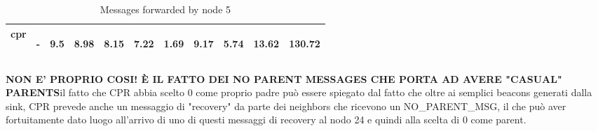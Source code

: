 \documentclass{article}
\begin{document}
\begin{table}[H]
\begin{center}
\begin{tabular}{|c|c|c|c|c|c|c|c|c|c|c|}
				    cpr & \begin{footnotesize}-\end{footnotesize} & \begin{footnotesize}9.5\end{footnotesize} & \begin{footnotesize}8.98\end{footnotesize} & \begin{footnotesize}8.15\end{footnotesize} & \begin{footnotesize}7.22\end{footnotesize} & \begin{footnotesize}1.69\end{footnotesize} & \begin{footnotesize}9.17\end{footnotesize} & \begin{footnotesize}5.74\end{footnotesize} & \begin{footnotesize}13.62\end{footnotesize} & \begin{footnotesize}130.72\end{footnotesize}\\ \hline
			    \end{tabular}
			\end{center}	
			\caption{Messages forwarded by node 5}
			\label{tab:25F24}
		\end{table}


\textbf{NON E' PROPRIO COSI! È IL FATTO DEI NO PARENT MESSAGES CHE PORTA AD AVERE "CASUAL" PARENTS}il fatto che CPR abbia scelto 0 come proprio padre può essere spiegato dal fatto che oltre ai semplici beacons generati dalla sink, CPR prevede anche un messaggio di "recovery" da parte dei neighbors che ricevono un NO\_PARENT\_MSG, il che può aver fortuitamente dato luogo all'arrivo di uno di questi messaggi di recovery al nodo 24 e quindi alla scelta di 0 come parent.
\clearpage
\end{document}
